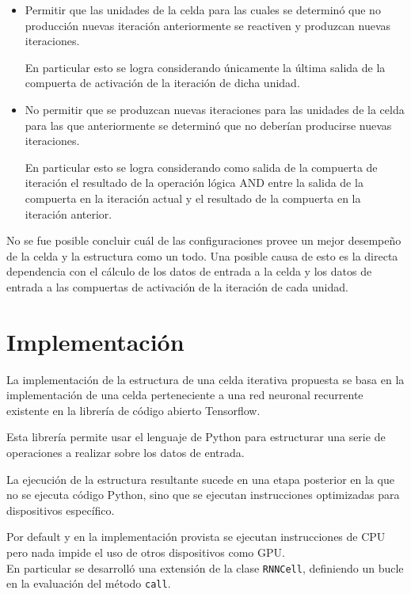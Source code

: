\documentclass{article}
\begin{document}
\begin{itemize}
\item Permitir que las unidades de la celda para las cuales se determinó que no producción nuevas iteración anteriormente se reactiven y produzcan nuevas iteraciones.

En particular esto se logra considerando únicamente la última salida de la compuerta de activación de la iteración de dicha unidad.

\item No permitir que se produzcan nuevas iteraciones para las unidades de la celda para las que anteriormente se determinó que no deberían producirse nuevas iteraciones.

En particular esto se logra considerando como salida de la compuerta de iteración el resultado de la operación lógica AND entre la salida de la compuerta en la iteración actual y el resultado de la compuerta en la iteración anterior.

\end{itemize}

No se fue posible concluir cuál de las configuraciones provee un mejor desempeño de la celda y la estructura como un todo. Una posible causa de esto es la directa dependencia con el cálculo de los datos de entrada a la celda y los datos de entrada a las compuertas de activación de la iteración de cada unidad.

\section{Implementación}
La implementación de la estructura de una celda iterativa propuesta se basa en la implementación de una celda perteneciente a una red neuronal recurrente existente en la librería de código abierto Tensorflow.

Esta librería permite usar el lenguaje de Python para estructurar una serie de operaciones a realizar sobre los datos de entrada.

La ejecución de la estructura resultante sucede en una etapa posterior en la que no se ejecuta código Python, sino que se ejecutan instrucciones optimizadas para dispositivos específico.

Por default y en la implementación provista se ejecutan instrucciones de CPU pero nada impide el uso de otros dispositivos como GPU.\\

En particular se desarrolló una extensión de la clase \texttt{RNNCell}, definiendo un bucle en la evaluación del método \texttt{call}.
\end{document}
